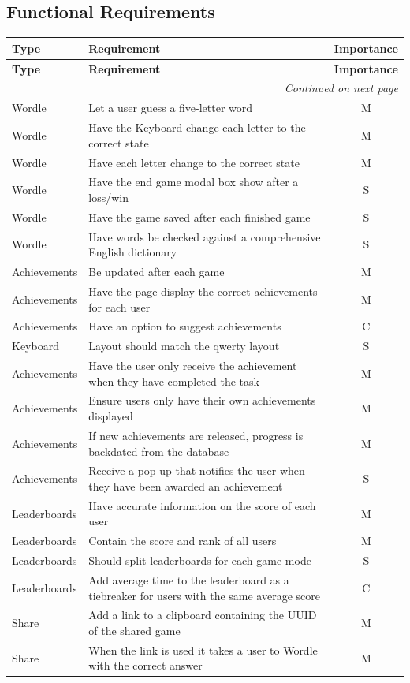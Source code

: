 \subsection{Functional Requirements}
\begin{tabularx}{\textwidth}{|l|X|c|}
\hline
\textbf{Type} & \textbf{Requirement} & \textbf{Importance} \\
\hline
\endfirsthead

\hline
\textbf{Type} & \textbf{Requirement} & \textbf{Importance} \\
\hline
\endhead

\hline
\multicolumn{3}{|r|}{\small\textit{Continued on next page}} \\
\hline
\endfoot

\hline
\endlastfoot
\hline
Wordle & Let a user guess a five-letter word & M \\
\hline
Wordle & Have the Keyboard change each letter to the correct state & M \\
\hline
Wordle & Have each letter change to the correct state & M \\
\hline
Wordle & Have the end game modal box show after a loss/win & S \\
\hline
Wordle & Have the game saved after each finished game & S \\
\hline
Wordle & Have words be checked against a comprehensive English dictionary & S \\
\hline
Achievements & Be updated after each game & M \\
\hline
Achievements & Have the page display the correct achievements for each user & M \\
\hline
Achievements & Have an option to suggest achievements & C \\
\hline
Keyboard & Layout should match the qwerty layout & S \\
\hline
Achievements & Have the user only receive the achievement when they have completed the task & M \\
\hline
Achievements & Ensure users only have their own achievements displayed & M \\
\hline
Achievements & If new achievements are released, progress is backdated from the database & M \\
\hline
Achievements & Receive a pop-up that notifies the user when they have been awarded an achievement & S \\
\hline
Leaderboards & Have accurate information on the score of each user & M \\
\hline
Leaderboards & Contain the score and rank of all users & M \\
\hline
Leaderboards & Should split leaderboards for each game mode & S \\
\hline
Leaderboards & Add average time to the leaderboard as a tiebreaker for users with the same average score & C \\
\hline
Share & Add a link to a clipboard containing the UUID of the shared game & M \\
\hline
Share & When the link is used it takes a user to Wordle with the correct answer & M \\
\hline
\end{tabularx}


